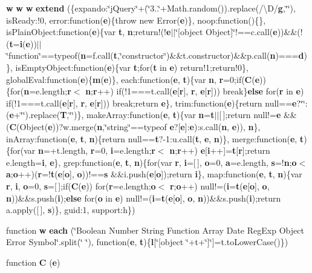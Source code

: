 \begin{DoxyCompactItemize}
{\bf w} {\bf w} {\bf w} {\bf extend} (\{expando\+:\char`\"{}j\+Query\char`\"{}+(\char`\"{}3..\char`\"{}+Math.\+random()).replace(/\textbackslash{}D/{\bf g},\char`\"{}\char`\"{}), is\+Ready\+:!0, error\+:function({\bf e})\{throw new Error({\bf e})\}, noop\+:function()\{\}, is\+Plain\+Object\+:function({\bf e})\{var {\bf t}, {\bf n};return!(!{\bf e}$\vert$$\vert$\char`\"{}[object Object]\char`\"{}!==c.\+call({\bf e}))\&\&(!({\bf t}={\bf i}({\bf e}))$\vert$$\vert$\char`\"{}function\char`\"{}==typeof({\bf n}=f.\+call({\bf t},\char`\"{}constructor\char`\"{})\&\&t.\+constructor)\&\&p.\+call({\bf n})==={\bf d})\}, is\+Empty\+Object\+:function({\bf e})\{var {\bf t};for({\bf t} in {\bf e}) return!1;return!0\}, global\+Eval\+:function({\bf e})\{{\bf m}({\bf e})\}, each\+:function({\bf e}, {\bf t})\{var {\bf n}, {\bf r}=0;if({\bf C}({\bf e}))\{for({\bf n}=e.\+length;{\bf r}$<$ {\bf n};{\bf r}++) if(!1===t.\+call({\bf e}[{\bf r}], {\bf r}, {\bf e}[{\bf r}])) break\}{\bf else} for({\bf r} in {\bf e}) if(!1===t.\+call({\bf e}[{\bf r}], {\bf r}, {\bf e}[{\bf r}])) break;return {\bf e}\}, trim\+:function({\bf e})\{return null=={\bf e}?\char`\"{}\char`\"{}\+:({\bf e}+\char`\"{}\char`\"{}).replace({\bf T},\char`\"{}\char`\"{})\}, make\+Array\+:function({\bf e}, {\bf t})\{var {\bf n}={\bf t}$\vert$$\vert$[$\,$];return null!={\bf e} \&\&({\bf C}(Object({\bf e}))?w.\+merge({\bf n},\char`\"{}string\char`\"{}==typeof {\bf e}?[{\bf e}]\+:{\bf e})\+:s.\+call({\bf n}, {\bf e})), {\bf n}\}, in\+Array\+:function({\bf e}, {\bf t}, {\bf n})\{return null=={\bf t}?-\/1\+:u.\+call({\bf t}, {\bf e}, {\bf n})\}, merge\+:function({\bf e}, {\bf t})\{for(var {\bf n}=+t.\+length, {\bf r}=0, {\bf i}=e.\+length;{\bf r}$<$ {\bf n};{\bf r}++) {\bf e}[{\bf i}++]={\bf t}[{\bf r}];return e.\+length={\bf i}, {\bf e}\}, grep\+:function({\bf e}, {\bf t}, {\bf n})\{for(var {\bf r}, {\bf i}=[$\,$], {\bf o}=0, {\bf a}=e.\+length, {\bf s}=!{\bf n};{\bf o}$<$ {\bf a};{\bf o}++)({\bf r}=!{\bf t}({\bf e}[{\bf o}], {\bf o}))!=={\bf s} \&\&i.\+push({\bf e}[{\bf o}]);return {\bf i}\}, map\+:function({\bf e}, {\bf t}, {\bf n})\{var {\bf r}, {\bf i}, {\bf o}=0, {\bf s}=[$\,$];if({\bf C}({\bf e})) for({\bf r}=e.\+length;{\bf o}$<$ {\bf r};{\bf o}++) null!=({\bf i}={\bf t}({\bf e}[{\bf o}], {\bf o}, {\bf n}))\&\&s.\+push({\bf i});{\bf else} for({\bf o} in {\bf e}) null!=({\bf i}={\bf t}({\bf e}[{\bf o}], {\bf o}, {\bf n}))\&\&s.\+push({\bf i});return a.\+apply([$\,$], {\bf s})\}, guid\+:1, support\+:h\})
\item 
function {\bf w} {\bf each} (\char`\"{}Boolean Number String Function Array Date Reg\+Exp Object Error Symbol\char`\"{}.split(\char`\"{} \char`\"{}), function({\bf e}, {\bf t})\{{\bf l}[\char`\"{}[object \char`\"{}+t+\char`\"{}]\char`\"{}]=t.\+to\+Lower\+Case()\})
\item 
function {\bf C} ({\bf e})
\end{DoxyCompactItemize}
